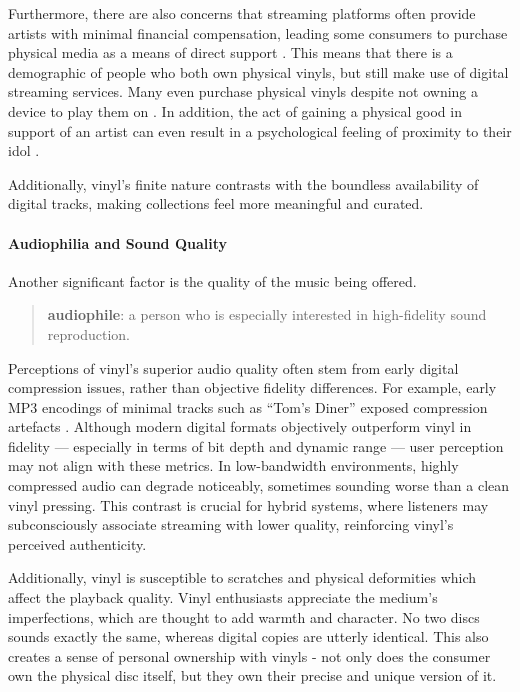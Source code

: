                 Furthermore, there are also concerns that streaming platforms often provide artists with minimal financial compensation, leading some consumers to purchase physical media as a means of direct support \cite{historyandrevivalofvinyls}. This means that there is a demographic of people who both own physical vinyls, but still make use of digital streaming services. Many even purchase physical vinyls despite not owning a device to play them on \cite{Trapp2023}. In addition, the act of gaining a physical good in support of an artist can even result in a psychological feeling of proximity to their idol \cite{historyandrevivalofvinyls}.
                
                Additionally, vinyl's finite nature contrasts with the boundless availability of digital tracks, making collections feel more meaningful and curated.
    
            \paragraph{Audiophilia and Sound Quality}
    
                Another significant factor is the quality of the music being offered.
    
                \begin{quote}
                    \textbf{audiophile}: a person who is especially interested in high-fidelity sound reproduction. \cite{audiophile2025}
                \end{quote}
    
                Perceptions of vinyl’s superior audio quality often stem from early digital compression issues, rather than objective fidelity differences. For example, early MP3 encodings of minimal tracks such as ``Tom’s Diner'' exposed compression artefacts \cite{maguire2014ghost}. Although modern digital formats objectively outperform vinyl in fidelity — especially in terms of bit depth and dynamic range — user perception may not align with these metrics. In low-bandwidth environments, highly compressed audio can degrade noticeably, sometimes sounding worse than a clean vinyl pressing. This contrast is crucial for hybrid systems, where listeners may subconsciously associate streaming with lower quality, reinforcing vinyl’s perceived authenticity.
    
                Additionally, vinyl is susceptible to scratches and physical deformities which affect the playback quality. Vinyl enthusiasts appreciate the medium’s imperfections, which are thought to add warmth and character. No two discs sounds exactly the same, whereas digital copies are utterly identical. This also creates a sense of personal ownership with vinyls - not only does the consumer own the physical disc itself, but they own their precise and unique version of it.
    
